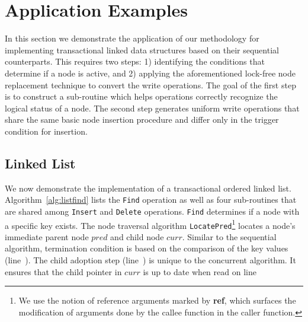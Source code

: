 \documentclass[10pt,conference,compsocconf]{IEEEtran}
\begin{document}
\section{Application Examples}
\label{sec:application}
In this section we demonstrate the application of our methodology for implementing transactional linked data structures based on their sequential counterparts. This requires two steps: 1) identifying the conditions that determine if a node is active, and 2) applying the aforementioned lock-free node replacement technique to convert the write operations. The goal of the first step is to construct a sub-routine which helps operations correctly recognize the logical status of a node.
The second step generates uniform write operations that share the same basic node insertion procedure and differ only in the trigger condition for insertion.

\subsection{Linked List}
\label{sec:applist}
We now demonstrate the implementation of a transactional ordered linked list.
Algorithm~\ref{alg:listfind} lists the \texttt{Find} operation as well as four sub-routines that are shared among \texttt{Insert} and \texttt{Delete} operations.
\texttt{Find} determines if a node with a specific key exists.
The node traversal algorithm \texttt{LocatePred}\footnote{We use the notion of reference arguments marked by \textbf{ref}, which surfaces the modification of arguments done by the callee function in the caller function.} locates a node's immediate parent node $pred$ and child node $curr$. 
Similar to the sequential algorithm, termination condition is based on the comparison of the key values (line~).
The child adoption step (line~) is unique to the concurrent algorithm.
It ensures that the child pointer in $curr$ is up to date when read on line~
\end{document}
